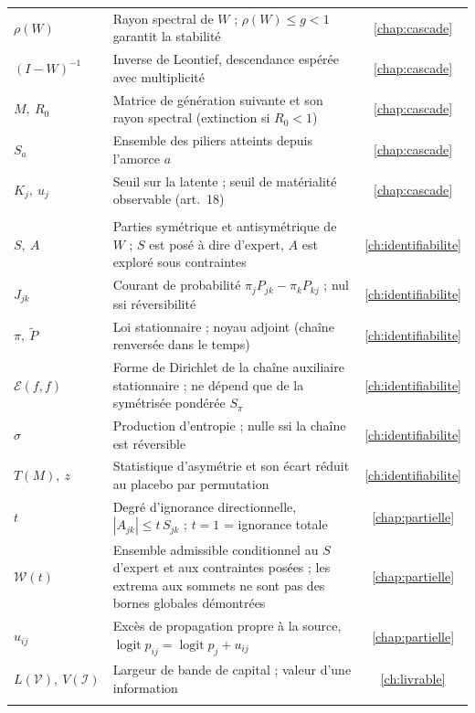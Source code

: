 {\begin{longtable}{>{\raggedright}p{3.3cm} >{\raggedright\arraybackslash}p{10.2cm} c}
$\rho(W)$ & Rayon spectral de $W$ ; $\rho(W)\le g<1$ garantit la stabilité & \ref{chap:cascade} \\
$(I-W)^{-1}$ & Inverse de Leontief, descendance espérée avec multiplicité & \ref{chap:cascade} \\
$M,\ R_0$ & Matrice de génération suivante et son rayon spectral (extinction si $R_0<1$) & \ref{chap:cascade} \\
$S_a$ & Ensemble des piliers atteints depuis l'amorce $a$ & \ref{chap:cascade} \\
$K_j,\ u_j$ & Seuil sur la latente ; seuil de matérialité observable (art.~18) & \ref{chap:cascade} \\
\midrule
\multicolumn{3}{@{}l}{\emph{\textcolor{navy}{Identifiabilité et identification partielle}}} \\
$S,\ A$ & Parties symétrique et antisymétrique de $W$ ; $S$ est posé à dire d'expert, $A$ est exploré sous contraintes & \ref{ch:identifiabilite} \\
$J_{jk}$ & Courant de probabilité $\pi_jP_{jk}-\pi_kP_{kj}$ ; nul ssi réversibilité & \ref{ch:identifiabilite} \\
$\pi,\ \tilde P$ & Loi stationnaire ; noyau adjoint (chaîne renversée dans le temps) & \ref{ch:identifiabilite} \\
$\mathcal{E}(f,f)$ & Forme de Dirichlet de la chaîne auxiliaire stationnaire ; ne dépend que de la symétrisée pondérée $S_\pi$ & \ref{ch:identifiabilite} \\
$\sigma$ & Production d'entropie ; nulle ssi la chaîne est réversible & \ref{ch:identifiabilite} \\
$T(M),\ z$ & Statistique d'asymétrie et son écart réduit au placebo par permutation & \ref{ch:identifiabilite} \\
$t$ & Degré d'ignorance directionnelle, $|A_{jk}|\le t\,S_{jk}$ ; $t=1$ = ignorance totale & \ref{chap:partielle} \\
$\mathcal{W}(t)$ & Ensemble admissible conditionnel au $S$ d'expert et aux contraintes posées ; les extrema aux sommets ne sont pas des bornes globales démontrées & \ref{chap:partielle} \\
$u_{ij}$ & Excès de propagation propre à la source, $\operatorname{logit}p_{ij}=\operatorname{logit}p_j+u_{ij}$ & \ref{chap:partielle} \\
$L(\mathcal{V}),\ V(\mathcal{I})$ & Largeur de bande de capital ; valeur d'une information & \ref{ch:livrable} \\
\midrule
\multicolumn{3}{@{}l}{\emph{\textcolor{navy}{Socle : fréquence et sévérité}}} \\

\end{longtable}}
